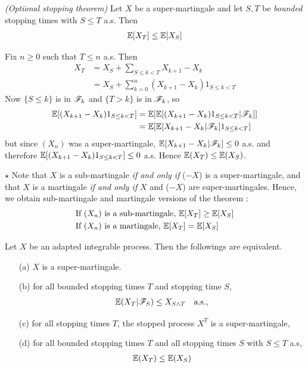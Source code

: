 \documentclass[10pt,a4paper]{report}
\newenvironment{proof}
{\begin{changemargin}{1cm}{0.5cm} 
	}%
	{\end{changemargin}
}
\begin{document}
 \emph{(Optional stopping theorem)} Let $X$ be a super-martingale and let $S,T$ be \emph{bounded} stopping times with $S \leq T$ a.s. Then
\begin{align*}
\mathbb{E}[X_T] \leq \mathbb{E}[X_S]
\end{align*}
\begin{proof}
\pf Fix $n\geq 0$ such that $T\leq n$ a.s. Then
\begin{align*}
X_T &= X_S + \sum_{S\leq k <T} X_{k+1} - X_k  \\
&= X_S + \sum_{k=0}^n (X_{k+1} - X_k) 1_{S\leq k <T}
\end{align*}
Now $\{S\leq k\}$ is in $\mathscr{F}_k$ and $\{T>k\}$ is in $\mathscr{F}_k$, so
\begin{align*}
\mathbb{E}[(X_{k+1} - X_k)1_{S\leq k <T}  ] &= \mathbb{E} [\mathbb{E}[ (X_{k+1} - X_k) 1_{S\leq k<T} |\mathscr{F}_k ]] \\
& = \mathbb{E}[ \mathbb{E} [  X_{k+1} -X_k | \mathscr{F}_k ] 1_{S\leq k < T} ]
\end{align*}
but since $(X_n)$ was a super-martingale,  $\mathbb{E} [  X_{k+1} -X_k | \mathscr{F}_k ] \leq 0$ a.s. and therefore $\mathbb{E}[(X_{k+1} - X_k)1_{S\leq k <T}  ] \leq 0$ a.s. Hence $\mathbb{E}(X_T) \leq \mathbb{E}(X_S)$.

\eop
\end{proof}
\s

$\star$ Note that $X$ is a sub-martingale \emph{if and only if} ($-X$) is a super-martingale, and that $X$ is a martingale \emph{if and only if} $X$ and ($-X$) are super-martingales. Hence, we obtain sub-martingale and martingale versions of the theorem :
\begin{align*}
&\text{If } (X_n) \text{ is a sub-martingale, } \mathbb{E}[X_T] \geq \mathbb{E}[X_S] \\
&\text{If } (X_n) \text{ is a martingale, } \mathbb{E}[X_T] = \mathbb{E}[X_S]
\end{align*}
\s

 Let $X$ be an adapted integrable process. Then the followings are equivalent.
\begin{itemize}
\item[(a)] $X$ is a super-martingale. 
\item[(b)] for all bounded stopping times $T$ and stopping time $S$,
\begin{align*}
\mathbb{E}(X_T |\mathscr{F}_S) \leq X_{S\wedge T} \quad \text{a.s.},
\end{align*}
\item[(c)] for all stopping times $T$, the stopped process $X^T$ is a super-martingale,
\item[(d)] for all bounded stopping times $T$ and all stopping times $S$ with $S\leq T$ a.s,
\begin{align*}
\mathbb{E}(X_T) \leq \mathbb{E}(X_S)
\end{align*}
\end{itemize}
\end{document}
